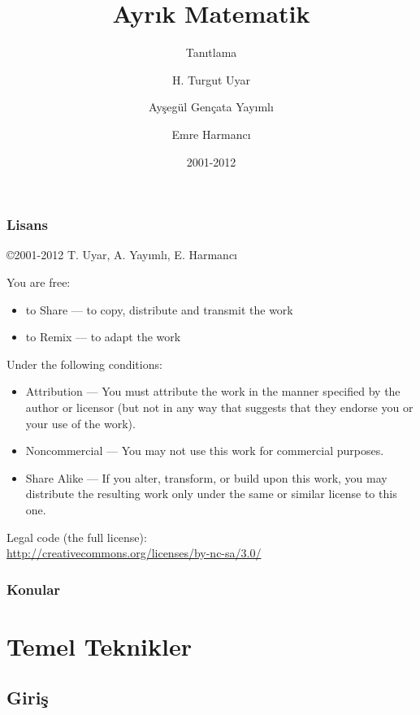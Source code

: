 \documentclass[dvipsnames]{beamer}
\title{Ayrık Matematik}
\subtitle{Tanıtlama}
\author{H. Turgut Uyar \and Ayşegül Gençata Yayımlı \and Emre Harmancı}
\date{2001-2012}
\theoremstyle{definition}
\theoremstyle{example}
\theoremstyle{plain}
\begin{document}
\begin{frame}
  \titlepage
\end{frame}

\begin{frame}
  \frametitle{Lisans}

  \hfill
  \copyright 2001-2012 T. Uyar, A. Yayımlı, E. Harmancı

  \vfill
  \begin{tiny}
    You are free:
    \begin{itemize}
      \item to Share — to copy, distribute and transmit the work
      \item to Remix — to adapt the work
    \end{itemize}

    Under the following conditions:
    \begin{itemize}
      \item Attribution — You must attribute the work in the manner specified by
        the author or licensor (but not in any way that suggests that they
        endorse you or your use of the work).

      \item Noncommercial — You may not use this work for commercial purposes.

      \item Share Alike — If you alter, transform, or build upon this work, you
        may distribute the resulting work only under the same or similar license
        to this one.
    \end{itemize}
  \end{tiny}

  \vfill
  Legal code (the full license):\\
  \url{http://creativecommons.org/licenses/by-nc-sa/3.0/}
\end{frame}

\begin{frame}
  \frametitle{Konular}
  \tableofcontents
\end{frame}

\section{Temel Teknikler}

\subsection{Giriş}
\end{document}
